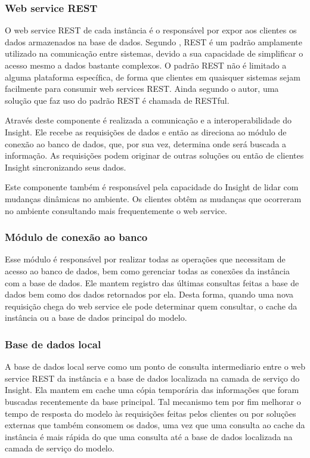 \documentclass[english,brazilian]{UNISINOSmonografia}
\begin{document}
\subsubsection{Web service REST}
O web service REST de cada instância é o responsável por expor aos clientes os dados armazenados na base de dados. Segundo , REST é um padrão amplamente utilizado na comunicação entre sistemas, devido a sua capacidade de simplificar o acesso mesmo a dados bastante complexos. O padrão REST não é limitado a alguma plataforma específica, de forma que clientes em quaisquer sistemas sejam facilmente para consumir web services REST. Ainda segundo o autor, uma solução que faz uso do padrão REST é chamada de RESTful.

Através deste componente é realizada a comunicação e a interoperabilidade do Insight. Ele recebe as requisições de dados e então as direciona ao módulo de conexão ao banco de dados, que, por sua vez, determina onde será buscada a informação. As requisições podem originar de outras soluções ou então de clientes Insight sincronizando seus dados.

Este componente também é responsável pela capacidade do Insight de lidar com mudanças dinâmicas no ambiente. Os clientes obtêm as mudanças que ocorreram no ambiente consultando mais frequentemente o web service.

\subsubsection{Módulo de conexão ao banco}
Esse módulo é responsável por realizar todas as operações que necessitam de acesso ao banco de dados, bem como gerenciar todas as conexões da instância com a base de dados. Ele mantem registro das últimas consultas feitas a base de dados bem como dos dados retornados por ela. Desta forma, quando uma nova requisição chega do web service ele pode determinar quem consultar, o cache da instância ou a base de dados principal do modelo. 

\subsubsection{Base de dados local}
A base de dados local serve como um ponto de consulta intermediario entre o web service REST da instância e a base de dados localizada na camada de serviço do Insight. Ela mantem em cache uma cópia temporária das informações que foram buscadas recentemente da base principal. Tal mecanismo tem por fim melhorar o tempo de resposta do modelo às requisições feitas pelos clientes ou por soluções externas que também consomem os dados, uma vez que uma consulta ao cache da instância é mais rápida do que uma consulta até a base de dados localizada na camada de serviço do modelo.
\end{document}
